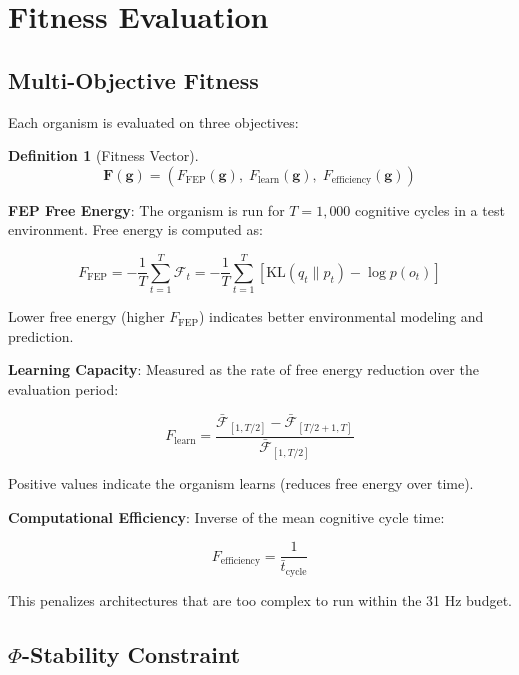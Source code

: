 \documentclass[11pt,a4paper]{article}
\newtheorem{definition}{Definition}
\begin{document}
\section{Fitness Evaluation}

\subsection{Multi-Objective Fitness}

Each organism is evaluated on three objectives:

\begin{definition}[Fitness Vector]
\begin{equation}
\mathbf{F}(\mathbf{g}) = \left(F_{\text{FEP}}(\mathbf{g}), \; F_{\text{learn}}(\mathbf{g}), \; F_{\text{efficiency}}(\mathbf{g})\right)
\end{equation}
\end{definition}

\textbf{FEP Free Energy}: The organism is run for $T = 1{,}000$ cognitive cycles in a test environment. Free energy is computed as:

\begin{equation}
F_{\text{FEP}} = -\frac{1}{T} \sum_{t=1}^{T} \mathcal{F}_t = -\frac{1}{T} \sum_{t=1}^{T} \left[\text{KL}(q_t \| p_t) - \log p(o_t)\right]
\end{equation}

Lower free energy (higher $F_{\text{FEP}}$) indicates better environmental modeling and prediction.

\textbf{Learning Capacity}: Measured as the rate of free energy reduction over the evaluation period:

\begin{equation}
F_{\text{learn}} = \frac{\bar{\mathcal{F}}_{[1,T/2]} - \bar{\mathcal{F}}_{[T/2+1,T]}}{\bar{\mathcal{F}}_{[1,T/2]}}
\end{equation}

Positive values indicate the organism learns (reduces free energy over time).

\textbf{Computational Efficiency}: Inverse of the mean cognitive cycle time:

\begin{equation}
F_{\text{efficiency}} = \frac{1}{\bar{t}_{\text{cycle}}}
\end{equation}

This penalizes architectures that are too complex to run within the 31 Hz budget.

\subsection{$\Phi$-Stability Constraint}
\end{document}
